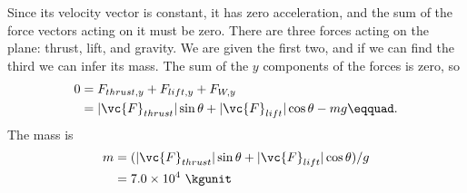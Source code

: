 Since its velocity vector is constant, it has zero
acceleration, and the sum of the force vectors acting on it
must be zero. There are three forces acting on the plane:
thrust, lift, and gravity. We are given the first two, and
if we can find the third we can infer its mass. The sum of
the $y$ components of the forces is zero, so
\begin{align*}
        0     &=  F_{thrust,y} +F_{lift,y} +F_{W,y}   \\
             &=  |\vc{F}_{thrust}| \sin  \theta 
               + |\vc{F}_{lift}| \cos  \theta - mg\eqquad.
\end{align*}
The mass is
\begin{align*}
        m     &=  (|\vc{F}_{thrust}| \sin  \theta
                 + |\vc{F}_{lift}| \cos  \theta ) / g  \\
             &=  7.0\times10^4\ \kgunit
\end{align*}
